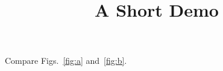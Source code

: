 \documentclass[article]{jss}
\title{A Short Demo}
\begin{document}
Compare Figs.~\ref{fig:a} and~\ref{fig:b}.
\end{document}
